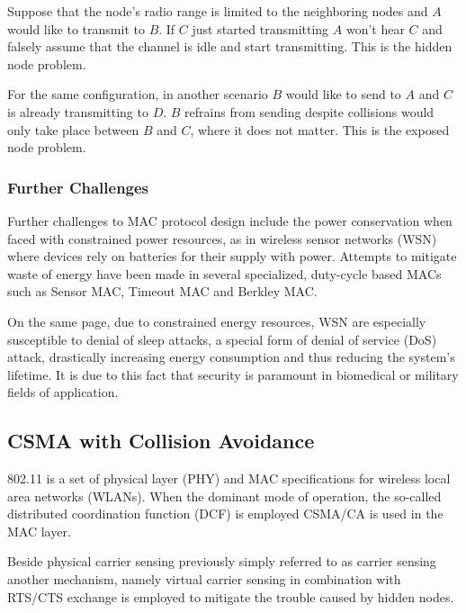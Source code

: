 Suppose that the node's radio range is limited to the neighboring nodes and $A$ would like to transmit to $B$. If $C$ just started transmitting $A$ won't hear $C$ and falsely assume that the channel is idle and start transmitting. This is the hidden node problem.

\bigskip

For the same configuration, in another scenario $B$ would like to send to $A$ and $C$ is already transmitting to $D$. $B$ refrains from sending despite collisions would only take place between $B$ and $C$, where it does not matter. This is the exposed node problem. 

\bigskip

\subsubsection{Further Challenges}

Further challenges to MAC protocol design include the power conservation when faced with constrained power resources, as in wireless sensor networks (WSN) where devices rely on batteries for their supply with power. Attempts to mitigate waste of energy have been made in several specialized, duty-cycle based MACs such as Sensor MAC, Timeout MAC and Berkley MAC.

\bigskip

On the same page, due to constrained energy resources, WSN are especially susceptible to denial of sleep attacks, a special form of denial of service (DoS) attack, drastically increasing energy consumption and thus reducing the system's lifetime. It is due to this fact that security is paramount in biomedical or military fields of application. 

\subsection{CSMA with Collision Avoidance}

802.11 is a set of physical layer (PHY) and MAC specifications for wireless local area networks (WLANs). When the dominant mode of operation, the so-called distributed coordination function (DCF) is employed CSMA/CA is used in the MAC layer.

\bigskip

Beside physical carrier sensing previously simply referred to as carrier sensing another mechanism, namely virtual carrier sensing in combination with RTS/CTS exchange is employed to mitigate the trouble caused by hidden nodes. 


